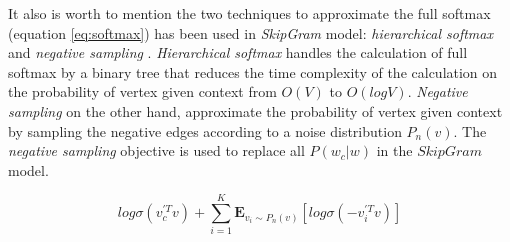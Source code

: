 It also is worth to mention the two techniques to approximate the full softmax (equation \ref{eq:softmax}) has been used in \emph{SkipGram} model: \emph{hierarchical softmax} \cite{morin2005hierarchical} and \emph{negative sampling} \cite{gutmann2012noise} \cite{mikolov2013distributed}. \emph{Hierarchical softmax} handles the calculation of full softmax by a binary tree that reduces the time complexity of the calculation on the probability of vertex given context from $O(V)$ to $O(logV)$. \emph{Negative sampling} on the other hand, approximate the probability of vertex given context by sampling the negative edges according to a noise distribution $P_n(v)$. The \emph{negative sampling} objective is used to replace all $P(w_c | w)$ in the $SkipGram$ model.

\begin{equation}
    log \sigma (v_c^{'T} v) + \sum_{i=1}^K \mathbf{E}_{v_i \sim P_n(v)}[log \sigma (-v_i^{'T} v)] 
\end{equation}